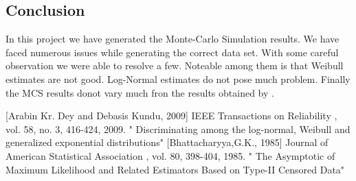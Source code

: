 \documentclass[twoside]{article}
\begin{document}
\begin{multicols}{2}
\section*{Conclusion}
In this project we have generated the Monte-Carlo Simulation results. We have faced numerous issues while generating the correct data set. With some careful observation we were able to resolve a few. Noteable among them is that Weibull estimates are not good. Log-Normal estimates do not pose much problem. Finally the MCS results donot vary much fron the results obtained by \cite{ad09}.







\begin{thebibliography}{99} %

[Arabin Kr. Dey and Debasis Kundu, 2009]{}
 IEEE Transactions on Reliability , vol. 58, no. 3, 416-424, 2009. 
\newblock  " Discriminating among the log-normal, Weibull and generalized exponential distributions"
[Bhattacharyya,G.K., 1985]{}
 Journal of American Statistical Association , vol. 80, 398-404, 1985. 
\newblock  " The Asymptotic of Maximum Likelihood and Related Estimators Based on Type-II Censored Data"
 
\end{thebibliography}


\end{multicols}
\end{document}
